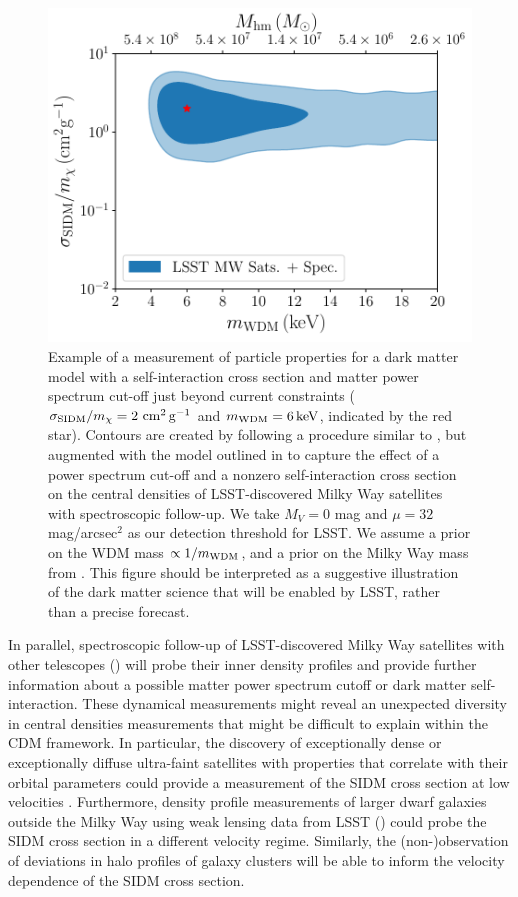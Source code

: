 \begin{figure}
\centering
\includegraphics[width=0.6\columnwidth]{figures/WDM_SIDM_discovery_test.pdf}
\caption{\label{fig:sidm_wdm_disc} Example of a measurement of particle properties for a dark matter model with a self-interaction cross section and matter power spectrum cut-off just beyond current constraints ($\sigma_{\rm SIDM}/m_\chi = 2 \mathrm{\,\mathrm{\,cm}^2\mathrm{\,g}^{-1}}$ and $m_{\rm WDM} = 6\mathrm{\,keV}$, indicated by the red star). Contours are created by following a procedure similar to \citet{Nadler:2018}, but augmented with the model outlined in  to capture the effect of a power spectrum cut-off and a nonzero self-interaction cross section on the central densities of LSST-discovered Milky Way satellites with spectroscopic follow-up. We take $M_V=0$ mag and $\mu=32$ mag/arcsec$^2$ as our detection threshold for LSST. We assume a prior on the WDM mass $\propto 1/m_{\rm WDM}$, and a prior on the Milky Way mass from \citet{Callingham:2018vcf}. This figure should be interpreted as a suggestive illustration of the dark matter science that will be enabled by LSST, rather than a precise forecast.  
}
\end{figure}

In parallel, spectroscopic follow-up of LSST-discovered Milky Way satellites with other telescopes () will probe their inner density profiles and provide further information about a possible matter power spectrum cutoff or dark matter self-interaction. These dynamical measurements might reveal an unexpected diversity in central densities measurements that might be difficult to explain within the CDM framework. In particular, the discovery of exceptionally dense or exceptionally diffuse ultra-faint satellites with properties that correlate with their orbital parameters could provide a measurement of the SIDM cross section at low velocities \citep{Nishikawa:2019lsc}. Furthermore, density profile measurements of larger dwarf galaxies outside the Milky Way using weak lensing data from LSST () could probe the SIDM cross section in a different velocity regime. Similarly, the (non-)observation of deviations in halo profiles of galaxy clusters will be able to inform the velocity dependence of the SIDM cross section.


